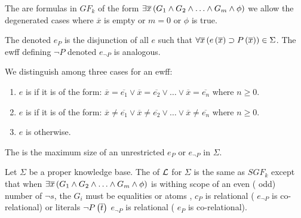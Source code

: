 \begin{defi}
The  are formulas in $GF_k$ of the form $\exists\overline{x}\left( G_1\wedge G_2\wedge\ldots\wedge G_m\wedge\phi\right)$ we allow the degenerated cases where $\overline{x}$ is empty or $m=0$ or $\phi$ is true.
\cite{conf/ijcai/LiuL03}
\end{defi}

\begin{defi}
The  denoted $e_P$ is the disjunction of all $e$ such that $\forall\overline{x}\left( e\left(\overline{x}\right)\supset P\left(\overline{x}\right)\right)\in\Sigma$. The ewff defining $\neg P$ denoted $e_{\neg P}$ is analogous.
\cite{conf/ijcai/LiuL03}
\end{defi}

\begin{defi}
We distinguish among three cases for an ewff:
\begin{enumerate}
 \item $e$ is  if it is of the form: $\overline{x}=\overline{e_1}\vee\overline{x}=\overline{e_2}\vee\ldots\vee\overline{x}=\overline{e_n}$ where $n\geq0$.
 \item $e$ is  if it is of the form: $\overline{x}\neq\overline{e_1}\vee\overline{x}\neq\overline{e_2}\vee\ldots\vee\overline{x}\neq\overline{e_n}$ where $n\geq0$.
 \item $e$ is  otherwise.
\end{enumerate}
\cite{conf/ijcai/LiuL03}
\end{defi}

\begin{defi}
The  is the maximum size of an unrestricted $e_P$ or $e_{\neg P}$ in $\Sigma$.
\cite{conf/ijcai/LiuL03}
\end{defi}

\begin{defi}
Let $\Sigma$ be a proper knowledge base. The  of $\mathcal{L}$ for $\Sigma$ is the same as $SGF_k$ except that when $\exists\overline{x}\left( G_1\wedge G_2\wedge\ldots\wedge G_m\wedge\phi\right)$ is withing scope of an even (\respTx{} odd) number of $\neg s$, the $G_i$ must be equalities or atoms , \stTx{} $c_P$ is relational (\respTx{} $e_{\neg P}$ is co-relational) or literals $\neg P\left(\overline{t}\right)$ \stTx{} $e_{\neg P}$ is relational (\respTx{} $e_P$ is co-relational).
\cite{conf/ijcai/LiuL03}
\end{defi}

